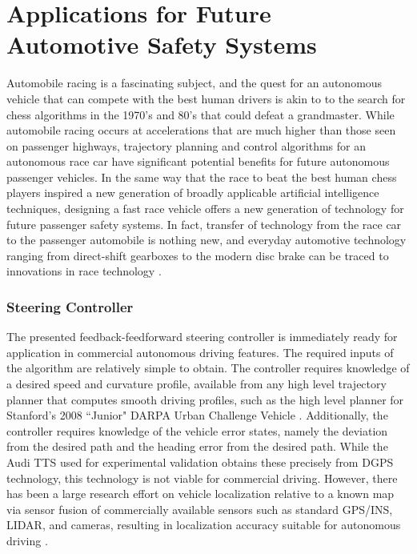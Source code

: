 \section{Applications for Future Automotive Safety \newline Systems}

Automobile racing is a fascinating subject, and the quest for an autonomous vehicle that can compete with the best human drivers is akin to 
to the search for chess algorithms in the 1970's and 80's that could defeat a grandmaster. While automobile racing occurs at
accelerations that are much higher than those seen on passenger highways, trajectory planning and control algorithms for an autonomous
race car have significant potential benefits for future autonomous passenger vehicles. In the same way that the race to beat the best
human chess players inspired a new generation of broadly applicable artificial intelligence techniques, designing a fast race vehicle
offers a new generation of technology for future passenger safety systems. In fact, transfer of technology from the race car
to the passenger automobile is nothing new, and everyday automotive technology ranging from direct-shift gearboxes to the modern 
disc brake can be traced to innovations in race technology \cite{deaton}. 

\subsubsection{Steering Controller}

The presented feedback-feedforward steering controller is immediately ready for application in commercial autonomous driving features.
The required inputs of the algorithm are relatively simple to obtain. The controller requires knowledge of a desired speed and curvature
profile, available from any high level trajectory planner that computes smooth driving profiles, such as the high level planner for Stanford's
2008 ``Junior" DARPA Urban Challenge Vehicle \cite{junior08}. Additionally, the controller requires knowledge of the vehicle error states,
namely the deviation from the desired path and the heading error from the desired path. While the Audi TTS used for experimental validation obtains these
precisely from DGPS technology, this technology is not viable for commercial driving. However, there has been a large research effort on vehicle
localization relative to a known map via sensor fusion of commercially available sensors such as standard GPS/INS, LIDAR, and cameras, resulting in
localization accuracy suitable for autonomous driving \cite{jo2015}. 

